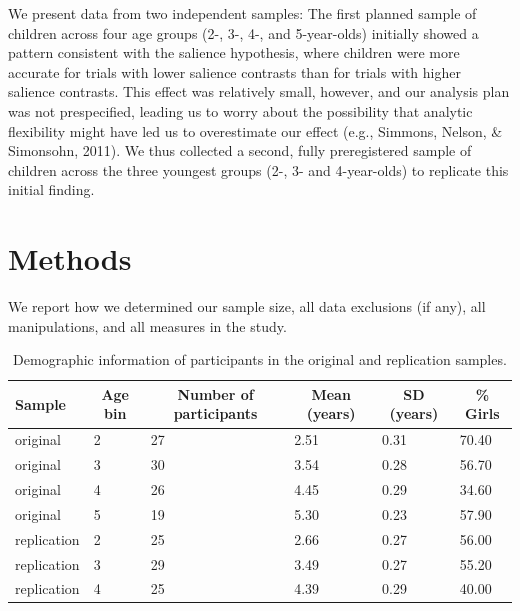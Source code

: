 \documentclass[mask,man]{apa6}
\theoremstyle{definition}
\theoremstyle{definition}
\theoremstyle{definition}
\theoremstyle{remark}
\begin{document}
We present data from two independent samples: The first planned sample
of children across four age groups (2-, 3-, 4-, and 5-year-olds)
initially showed a pattern consistent with the salience hypothesis,
where children were more accurate for trials with lower salience
contrasts than for trials with higher salience contrasts. This effect
was relatively small, however, and our analysis plan was not
prespecified, leading us to worry about the possibility that analytic
flexibility might have led us to overestimate our effect (e.g., Simmons,
Nelson, \& Simonsohn, 2011). We thus collected a second, fully
preregistered sample of children across the three youngest groups (2-,
3- and 4-year-olds) to replicate this initial finding.

\section{Methods}\label{methods}

We report how we determined our sample size, all data exclusions (if
any), all manipulations, and all measures in the study.

\begin{table}[tbp]
\begin{center}
\begin{threeparttable}
\caption{\label{tab:participantsummarytab}Demographic information of participants in the original and replication samples.}
\begin{tabular}{llllll}
\toprule
Sample & \multicolumn{1}{c}{Age bin} & \multicolumn{1}{c}{Number of participants} & \multicolumn{1}{c}{Mean (years)} & \multicolumn{1}{c}{SD (years)} & \multicolumn{1}{c}{\% Girls}\\
\midrule
original & 2 & 27 & 2.51 & 0.31 & 70.40\\
original & 3 & 30 & 3.54 & 0.28 & 56.70\\
original & 4 & 26 & 4.45 & 0.29 & 34.60\\
original & 5 & 19 & 5.30 & 0.23 & 57.90\\
replication & 2 & 25 & 2.66 & 0.27 & 56.00\\
replication & 3 & 29 & 3.49 & 0.27 & 55.20\\
replication & 4 & 25 & 4.39 & 0.29 & 40.00\\
\bottomrule
\end{tabular}
\end{threeparttable}
\end{center}
\end{table}
\end{document}
